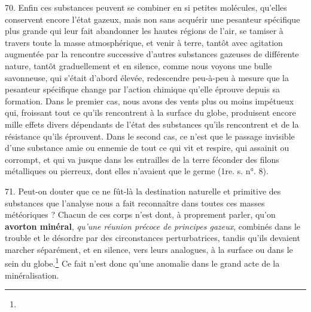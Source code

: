 \documentclass[a4paper, 11pt, oneside, polutonikogreek, french]{article}
\begin{document}
70. Enfin ces substances peuvent se combiner en si petites molécules, qu'elles conservent encore l'état gazeux, mais non sans acquérir une pesanteur spécifique plus grande qui leur fait abandonner les hautes régions de l'air, se tamiser à travers toute la masse atmosphérique, et venir à terre, tantôt avec agitation augmentée par la rencontre successive d'autres substances gazeuses de différente nature, tantôt graduellement et en silence, comme nous voyons une bulle savonneuse, qui s'était d'abord élevée, redescendre peu-à-peu à mesure que la pesanteur spécifique change par l'action chimique qu'elle éprouve depuis sa formation. Dans le premier cas, nous avons des vents plus ou moins impétueux qui, froissant tout ce qu'ils rencontrent à la surface du globe, produisent encore mille effets divers dépendants de l'état des substances qu'ils rencontrent et de la résistance qu'ils éprouvent. Dans le second cas, ce n'est que le passage invisible d'une substance amie ou ennemie de tout ce qui vit et respire, qui assainit ou corrompt, et qui va jusque dans les entrailles de la terre féconder des filons métalliques ou pierreux, dont elles n'avaient que le germe (1re. s. n°. 8).

71. Peut-on douter que ce ne fût-là la destination naturelle et primitive des substances que l'analyse nous a fait reconnaître dans toutes ces masses météoriques ? Chacun de ces corps n'est dont, à proprement parler, qu'on \textbf{avorton minéral}, \emph{qu'une réunion précoce de principes gazeux}, combinés dans le trouble et le désordre par des circonstances perturbatrices, tandis qu'ils devaient marcher séparément, et en silence, vers leurs analogues, à la surface ou dans le sein du globe.\footnote{} Ce fait n'est donc qu'une anomalie dans le grand acte de la minéralisation.
\end{document}
